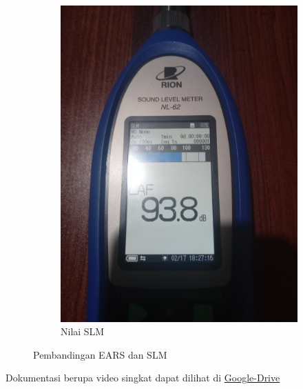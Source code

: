\documentclass[12pt]{book}
\begin{document}
\begin{figure}[!ht]
\begin{subfigure}[t]{0.4\textwidth}
			\includegraphics[width=\textwidth]{images/hasil/spl_slm}
			\caption{Nilai SLM}
		\end{subfigure}

		\caption{Pembandingan EARS dan SLM}
	\end{figure}

	Dokumentasi berupa video singkat dapat dilihat di \href{https://drive.google.com/drive/folders/1SL2Z-jUqwHkQO1tEB37UERUyHxoY6Bd-?usp=share_link}{Google-Drive}
\end{document}
